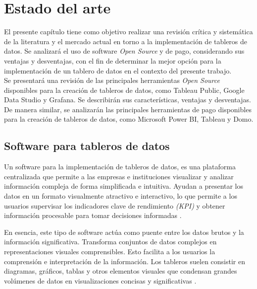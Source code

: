 
\chapter{Estado del arte}\label{cap:edoarte}


El presente capítulo tiene como objetivo realizar una revisión crítica y sistemática de la literatura y el mercado actual en torno a la implementación de tableros de datos. Se analizará el uso de software \textit{Open Source} y de pago, considerando sus ventajas y desventajas, con el fin de determinar la mejor opción para la implementación de un tablero de datos en el contexto del presente trabajo.\\

Se presentará una revisión de las principales herramientas \textit{Open Source} disponibles para la creación de tableros de datos, como Tableau Public, Google Data Studio y Grafana. Se describirán sus características, ventajas y desventajas. De manera similar, se analizarán las principales herramientas de pago disponibles para la creación de tableros de datos, como Microsoft Power BI, Tableau y Domo.



\section{Software para tableros de datos}\label{sec:seccion3.1}
Un software para la implementación de tableros de datos, es una plataforma centralizada que permite a las empresas e instituciones visualizar y analizar información compleja de forma simplificada e intuitiva. Ayudan a presentar los datos en un formato visualmente atractivo e interactivo, lo que permite a los usuarios supervisar los indicadores clave de rendimiento \textit{(KPI)} y obtener información procesable para tomar decisiones informadas \cite{wexler2017big}.

En esencia, este tipo de software actúa como puente entre los datos brutos y la información significativa. Transforma conjuntos de datos complejos en representaciones visuales comprensibles. Esto facilita a los usuarios la comprensión e interpretación de la información. Los tableros suelen consistir en diagramas, gráficos, tablas y otros elementos visuales que condensan grandes volúmenes de datos en visualizaciones concisas y significativas \cite{kirk2016data} \cite{kerzner2015dashboard}. \\

